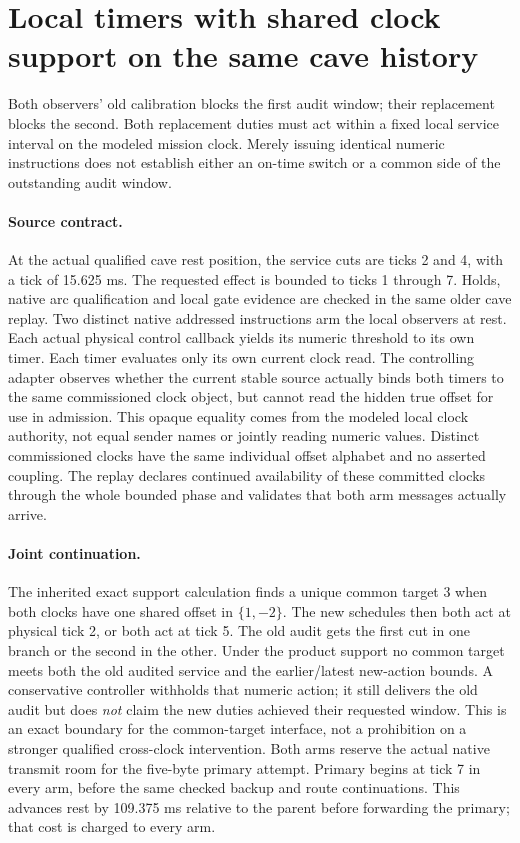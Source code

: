 \documentclass{article}
\begin{document}
\section*{Local timers with shared clock support on the same cave history}
Both observers' old calibration blocks the first audit window;
their replacement blocks the second. Both replacement duties
must act within a fixed local service interval on the modeled
mission clock. Merely issuing identical numeric instructions does
not establish either an on-time switch or a common side of
the outstanding audit window.

\paragraph{Source contract.}
At the actual qualified cave rest position, the service cuts
are ticks 2 and 4, with a tick of 15.625 ms. The requested
effect is bounded to ticks 1 through 7. Holds, native arc
qualification and local gate evidence are checked in the same
older cave replay. Two distinct native addressed instructions
arm the local observers at rest. Each actual physical control
callback yields its numeric threshold to its own timer. Each
timer evaluates only its own current clock read. The controlling
adapter observes whether the current stable source actually
binds both timers to the same commissioned clock object, but
cannot read the hidden true offset for use in admission.
This opaque equality comes from the modeled local clock
authority, not equal sender names or jointly reading numeric
values. Distinct commissioned clocks have the same individual
offset alphabet and no asserted coupling. The replay declares
continued availability of these committed clocks through
the whole bounded phase and validates that both arm messages
actually arrive.

\paragraph{Joint continuation.}
The inherited exact support calculation finds a unique common
target 3 when both clocks have one shared offset in
\(\{1,-2\}\). The new schedules then both act at physical tick 2,
or both act at tick 5. The old audit gets the first cut in
one branch or the second in the other. Under the product
support no common target meets both the old audited service
and the earlier/latest new-action bounds. A conservative
controller withholds that numeric action; it still delivers
the old audit but does \emph{not} claim the new duties achieved
their requested window. This is an exact boundary for the
common-target interface, not a prohibition on a stronger
qualified cross-clock intervention. Both arms reserve the
actual native transmit room for the five-byte primary attempt.
Primary begins at tick 7 in every arm, before the same checked
backup and route continuations. This advances rest by 109.375 ms
relative to the parent before forwarding the primary; that
cost is charged to every arm.
\end{document}
